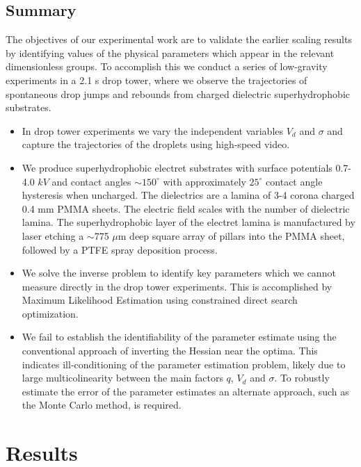 \documentclass[12pt,a4paper,oneside]{book}
\begin{document}
\section{Summary}
The objectives of our experimental work are to validate the earlier scaling results by identifying values of the physical parameters which appear in the relevant dimensionless groups. To accomplish this we conduct a series of low-gravity experiments in a 2.1 s drop tower, where we observe the trajectories of spontaneous drop jumps and rebounds from charged dielectric superhydrophobic substrates.
\begin{itemize}
\item  In drop tower experiments we vary the independent variables $V_d$ and $\sigma$ and capture the trajectories of the droplets using high-speed video. 
\item We produce superhydrophobic electret substrates with surface potentials 0.7-4.0 $kV$ and contact angles $\sim 150^{\circ}$ with approximately $25^{\circ}$ contact angle hysteresis when uncharged. The dielectrics are a lamina of 3-4 corona charged 0.4 mm PMMA sheets. The electric field scales with the number of dielectric lamina. The superhydrophobic layer of the electret lamina is manufactured by laser etching a $\sim$775 $\mu$m deep square array of pillars into the PMMA sheet, followed by a PTFE spray deposition process. 
\item We solve the inverse problem to identify key parameters which we cannot measure directly in the drop tower experiments. This is accomplished by Maximum Likelihood Estimation using constrained direct search optimization.
\item We fail to establish the identifiability of the parameter estimate using the conventional approach of inverting the Hessian near the optima. This indicates ill-conditioning of the parameter estimation problem, likely due to large multicolinearity between the main factors $q$, $V_d$ and $\sigma$. To robustly estimate the error of the parameter estimates an alternate approach, such as the Monte Carlo method, is required.
\end{itemize}

\chapter{Results}
\end{document}
